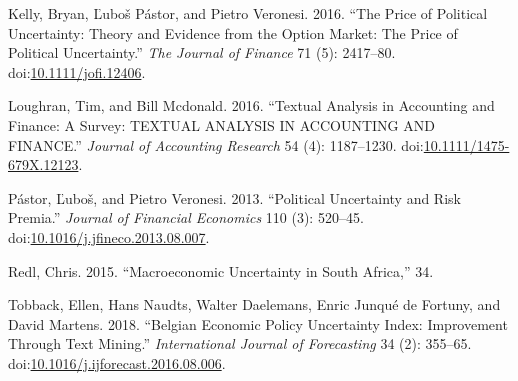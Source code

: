 \documentclass[11pt,preprint, authoryear]{elsarticle}
\numberwithin{equation}{section}
\numberwithin{figure}{section}
\numberwithin{table}{section}
\begin{document}
\hypertarget{ref-Kelly2016}{}
Kelly, Bryan, Ľuboš Pástor, and Pietro Veronesi. 2016. ``The Price of
Political Uncertainty: Theory and Evidence from the Option Market: The
Price of Political Uncertainty.'' \emph{The Journal of Finance} 71 (5):
2417--80.
doi:\href{https://doi.org/10.1111/jofi.12406}{10.1111/jofi.12406}.

\hypertarget{ref-Loughran2016}{}
Loughran, Tim, and Bill Mcdonald. 2016. ``Textual Analysis in Accounting
and Finance: A Survey: TEXTUAL ANALYSIS IN ACCOUNTING AND FINANCE.''
\emph{Journal of Accounting Research} 54 (4): 1187--1230.
doi:\href{https://doi.org/10.1111/1475-679X.12123}{10.1111/1475-679X.12123}.

\hypertarget{ref-Pastor2013}{}
Pástor, Ľuboš, and Pietro Veronesi. 2013. ``Political Uncertainty and
Risk Premia.'' \emph{Journal of Financial Economics} 110 (3): 520--45.
doi:\href{https://doi.org/10.1016/j.jfineco.2013.08.007}{10.1016/j.jfineco.2013.08.007}.

\hypertarget{ref-Redl2015}{}
Redl, Chris. 2015. ``Macroeconomic Uncertainty in South Africa,'' 34.

\hypertarget{ref-Tobback2018}{}
Tobback, Ellen, Hans Naudts, Walter Daelemans, Enric Junqué de Fortuny,
and David Martens. 2018. ``Belgian Economic Policy Uncertainty Index:
Improvement Through Text Mining.'' \emph{International Journal of
Forecasting} 34 (2): 355--65.
doi:\href{https://doi.org/10.1016/j.ijforecast.2016.08.006}{10.1016/j.ijforecast.2016.08.006}.




\end{document}
